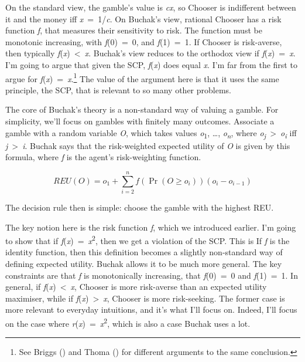 \documentclass[
  10pt,
  letterpaper,
  DIV=11,
  numbers=noendperiod,
  twoside]{scrartcl}
\begin{document}
On the standard view, the gamble's value is \emph{cx}, so Chooser is
indifferent between it and the money iff \emph{x}~=~1/\emph{c}. On
Buchak's view, rational Chooser has a risk function \emph{f}, that
measures their sensitivity to risk. The function must be monotonic
increasing, with \emph{f}(0)~=~0, and \emph{f}(1)~=~1. If Chooser is
risk-averse, then typically \emph{f}(\emph{x})~\textless~\emph{x}.
Buchak's view reduces to the orthodox view if
\emph{f}(\emph{x})~=~\emph{x}. I'm going to argue that given the SCP,
\emph{f}(\emph{x}) does equal \emph{x}. I'm far from the first to argue
for \emph{f}(\emph{x})~=~\emph{x}.\footnote{See Briggs
  () and Thoma
  () for different arguments to the same
  conclusion.} The value of the argument here is that it uses the same
principle, the SCP, that is relevant to so many other problems.

The core of Buchak's theory is a non-standard way of valuing a gamble.
For simplicity, we'll focus on gambles with finitely many outcomes.
Associate a gamble with a random variable \emph{O}, which takes values
\emph{o}\textsubscript{1}, \ldots, \emph{o\textsubscript{n}}, where
\emph{o\textsubscript{j}}~\textgreater~\emph{o\textsubscript{i}} iff
\emph{j}~\textgreater~\emph{i}. Buchak says that the risk-weighted
expected utility of \emph{O} is given by this formula, where \emph{f} is
the agent's risk-weighting function.

\[
REU(O) = o_1 + \sum_{i = 2}^n f(\Pr(O \geq o_i))(o_i - o_{i-1})
\]

The decision rule then is simple: choose the gamble with the highest
REU.

The key notion here is the risk function \emph{f}, which we introduced
earlier. I'm going to show that if
\emph{f}(\emph{x})~=~\emph{x}\textsuperscript{2}, then we get a
violation of the SCP. This is If \emph{f} is the identity function, then
this definition becomes a slightly non-standard way of defining expected
utility. Buchak allows it to be much more general. The key constraints
are that \emph{f} is monotonically increasing, that \emph{f}(0)~=~0 and
\emph{f}(1)~=~1. In general, if \emph{f}(\emph{x})~\textless~\emph{x},
Chooser is more risk-averse than an expected utility maximiser, while if
\emph{f}(\emph{x})~\textgreater~\emph{x}, Chooser is more risk-seeking.
The former case is more relevant to everyday intuitions, and it's what
I'll focus on. Indeed, I'll focus on the case where
\emph{r}(\emph{x})~=~\emph{x}\textsuperscript{2}, which is also a case
Buchak uses a lot.
\end{document}
